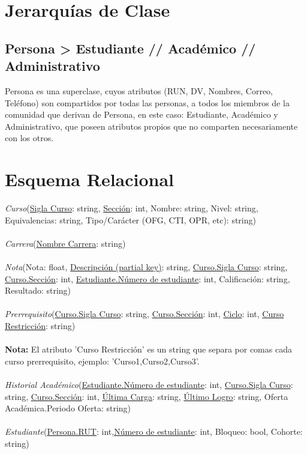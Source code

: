 \documentclass[12pt]{article}
\begin{document}
\section*{Jerarquías de Clase}
\subsection*{Persona \textgreater \; Estudiante // Académico // Administrativo}
Persona es una superclase, cuyos atributos (RUN, DV, Nombres, Correo, Teléfono) son compartidos por todas las personas, a todos los miembros de la comunidad que derivan de Persona, en este caso: Estudiante, Académico y Administrativo, que poseen atributos propios que no comparten necesariamente con los otros. 
\section*{Esquema Relacional}
\textit{Curso}(\underline{Sigla Curso}: string, \underline{Sección}: int, Nombre: string, Nivel: string, Equivalencias: string, Tipo/Carácter (OFG, CTI, OPR, etc): string)\\\\
\textit{Carrera}(\underline{Nombre Carrera}: string)\\\\
\textit{Nota}(Nota: float, \underline{Descripción (partial key)}: string, \underline{Curso.Sigla Curso}: string, \underline{Curso.Sección}: int, \underline{Estudiante.Número de estudiante}: int,
Calificación: string, Resultado: string)\\\\
\textit{Prerrequisito}(\underline{Curso.Sigla Curso}: string, \underline{Curso.Sección}: int, \underline{Ciclo}: int, \underline{Curso Restricción}: string)\\\\
\textbf{Nota:} El atributo 'Curso Restricción' es un string que separa por comas cada curso prerrequisito, ejemplo: 'Curso1,Curso2,Curso3'.\\\\
\textit{Historial Académico}(\underline{Estudiante.Número de estudiante}: int, \underline{Curso.Sigla Curso}: string, \underline{Curso.Sección}: int, \underline{Última Carga}: string, \underline{Último Logro}: string, Oferta Académica.Periodo Oferta: string)\\\\
\textit{Estudiante}(\underline{Persona.RUT}: int,\underline{Número de estudiante}: int, Bloqueo: bool, Cohorte: string)\\\\
\end{document}
